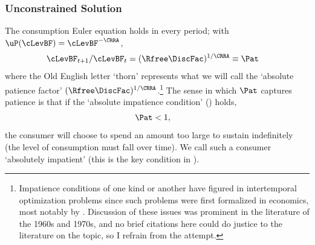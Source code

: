 \documentclass[BufferStockTheory]{subfiles}
\begin{document}
\hypertarget{Unconstrained-Solution}{}
\subsubsection{Unconstrained Solution} \label{subsec:PFUncon}

\hypertarget{APF}{}
\hypertarget{AIC}{}
The consumption Euler equation holds in every period; with $\uP(\cLevBF)=\cLevBF^{-\CRRA}$, \hypertarget{Pat}{}
\begin{align}
  \cLevBF_{t+1}/\cLevBF_{t}  & = (\Rfree\DiscFac)^{1/\CRRA} \equiv \Pat   \label{eq:Pat}
\end{align}
where the Old English letter `thorn' represents what we will call the
`absolute patience factor' $(\Rfree
\DiscFac)^{1/\CRRA}$.\footnote{Impatience conditions of one kind or
  another have figured in intertemporal optimization problems since
  such problems were first formalized in economics, most notably by \cite{ramseySave}.
  Discussion of these issues was prominent in the literature of the
  1960s and 1970s, and no brief citations here could do justice to the literature on the topic, so I refrain from the attempt.}  The sense in which $\Pat$ captures
patience is that if the `absolute impatience condition' (\AIC) holds,
\begin{align}
  \label{eq:AIC}
  \Pat  & < 1,
\end{align}
the consumer will choose to spend an amount too large to sustain indefinitely (the
level of consumption must fall over time).  We call such a consumer `absolutely impatient' (this is the key condition in \cite{bewleyPIH}).
\end{document}
